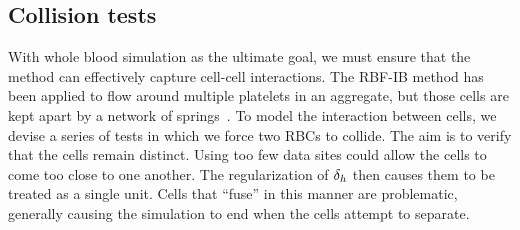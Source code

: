 \subsection{Collision tests}

With whole blood simulation as the ultimate goal, we must ensure that the method can
effectively capture cell-cell interactions. The RBF-IB method has been applied to flow
around multiple platelets in an aggregate, but those cells are kept apart by a network
of springs~\cite{Shankar:2015km}. To model the interaction between cells, we devise a
series of tests in which we force two RBCs to collide. The aim is to verify that the
cells remain distinct. Using too few data sites could allow the cells to come too close
to one another. The regularization of $\delta_h$ then causes them to be treated as a
single unit. Cells that ``fuse'' in this manner are problematic, generally causing the
simulation to end when the cells attempt to separate.


